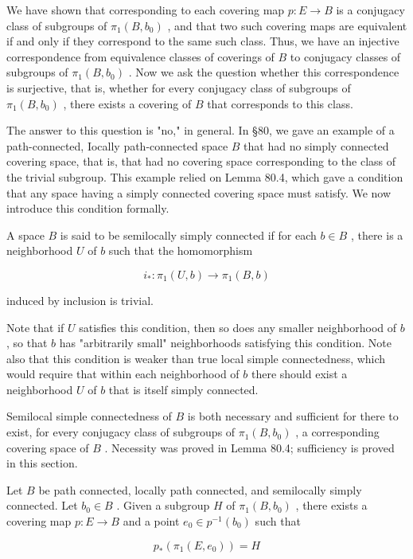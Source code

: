We have shown that corresponding to each covering map \(p : E \rightarrow  B\) is a conjugacy class of subgroups of \({\pi }_{1}\left( {B,{b}_{0}}\right)\) , and that two such covering maps are equivalent if and only if they correspond to the same such class. Thus, we have an injective correspondence from equivalence classes of coverings of \(B\) to conjugacy classes of subgroups of \({\pi }_{1}\left( {B,{b}_{0}}\right)\) . Now we ask the question whether this correspondence is surjective, that is, whether for every conjugacy class of subgroups of \({\pi }_{1}\left( {B,{b}_{0}}\right)\) , there exists a covering of \(B\) that corresponds to this class.

The answer to this question is "no," in general. In  \S 80, we gave an example of a path-connected, Iocally path-connected space \(B\) that had no simply connected covering space, that is, that had no covering space corresponding to the class of the trivial subgroup. This example relied on Lemma 80.4, which gave a condition that any space having a simply connected covering space must satisfy. We now introduce this condition formally.

\begin{definition} A space \(B\) is said to be semilocally simply connected if for each \(b \in  B\) , there is a neighborhood \(U\) of \(b\) such that the homomorphism

\[
{i}_{ * } : {\pi }_{1}\left( {U,b}\right)  \rightarrow  {\pi }_{1}\left( {B,b}\right)
\]

induced by inclusion is trivial.
\end{definition}

Note that if \(U\) satisfies this condition, then so does any smaller neighborhood of \(b\) , so that \(b\) has "arbitrarily small" neighborhoods satisfying this condition. Note also that this condition is weaker than true local simple connectedness, which would require that within each neighborhood of \(b\) there should exist a neighborhood \(U\) of \(b\) that is itself simply connected.

Semilocal simple connectedness of \(B\) is both necessary and sufficient for there to exist, for every conjugacy class of subgroups of \({\pi }_{1}\left( {B,{b}_{0}}\right)\) , a corresponding covering space of \(B\) . Necessity was proved in Lemma 80.4; sufficiency is proved in this section.

\begin{theorem} Let \(B\) be path connected, locally path connected, and semilocally simply connected. Let \({b}_{0} \in  B\) . Given a subgroup \(H\) of \({\pi }_{1}\left( {B,{b}_{0}}\right)\) , there exists a covering map \(p : E \rightarrow  B\) and a point \({e}_{0} \in  {p}^{-1}\left( {b}_{0}\right)\) such that

\[
{p}_{ * }\left( {{\pi }_{1}\left( {E,{e}_{0}}\right) }\right)  = H
\]
\end{theorem}

